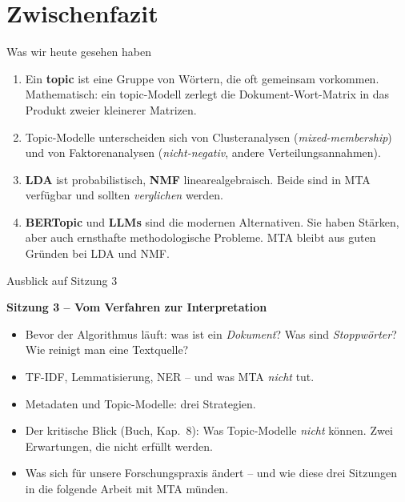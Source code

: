 \documentclass[aspectratio=169,11pt]{beamer}
\let\oldemph\emph
\renewcommand{\emph}[1]{{\color{solCyan}\oldemph{#1}}}
\let\oldtextbf\textbf
\renewcommand{\textbf}[1]{{\color{solBase3}\oldtextbf{#1}}}
\begin{document}
\section{Zwischenfazit}

\begin{frame}{Was wir heute gesehen haben}

  \begin{enumerate}
    \item Ein \textbf{topic} ist eine Gruppe von Wörtern, die oft
          gemeinsam vorkommen. Mathematisch: ein topic-Modell zerlegt
          die Dokument-Wort-Matrix in das Produkt zweier kleinerer
          Matrizen.
    \vfill
    \item Topic-Modelle unterscheiden sich von Clusteranalysen
          (\emph{mixed-membership}) und von Faktorenanalysen
          (\emph{nicht-negativ}, andere Verteilungsannahmen).
    \vfill
    \item \textbf{LDA} ist probabilistisch, \textbf{NMF}
          linearealgebraisch. Beide sind in MTA verfügbar und sollten
          \emph{verglichen} werden.
    \vfill
    \item \textbf{BERTopic} und \textbf{LLMs} sind die modernen
          Alternativen. Sie haben Stärken, aber auch ernsthafte
          methodologische Probleme. MTA bleibt aus guten Gründen bei
          LDA und NMF.
  \end{enumerate}

\end{frame}

\begin{frame}{Ausblick auf Sitzung 3}

  \textbf{Sitzung 3 – Vom Verfahren zur Interpretation}

  \vfill
  \begin{itemize}
    \item Bevor der Algorithmus läuft: was ist ein \emph{Dokument}?
          Was sind \emph{Stoppwörter}? Wie reinigt man eine Textquelle?
    \vfill
    \item TF-IDF, Lemmatisierung, NER – und was MTA \emph{nicht} tut.
    \vfill
    \item Metadaten und Topic-Modelle: drei Strategien.
    \vfill
    \item Der kritische Blick (Buch, Kap.~8): Was Topic-Modelle
          \emph{nicht} können. Zwei Erwartungen, die nicht erfüllt
          werden.
    \vfill
    \item Was sich für unsere Forschungspraxis ändert – und wie
          diese drei Sitzungen in die folgende Arbeit mit MTA münden.
  \end{itemize}

\end{frame}
\end{document}
